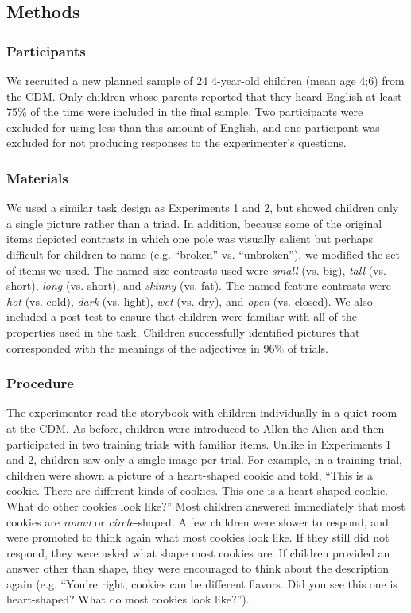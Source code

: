 \documentclass[man]{apa2}
\begin{document}
\subsection{Methods}

\subsubsection{Participants}

We recruited a new planned sample of 24 4-year-old children (mean age 4;6) from the CDM.  Only children whose parents reported that they heard English at least 75\% of the time were included in the final sample.  Two participants were excluded for using less than this amount of English, and one participant was excluded for not producing responses to the experimenter's questions.

\subsubsection{Materials}

We used a similar task design as Experiments 1 and 2, but showed children only a single picture rather than a triad.  In addition, because some of the original items depicted contrasts in which one pole was visually salient but perhaps difficult for children to name (e.g. ``broken'' vs. ``unbroken''), we modified the set of items we used.  The named size contrasts used were \emph{small} (vs. big), \emph{tall} (vs. short), \emph{long} (vs. short), and \emph{skinny} (vs. fat).  The named feature contrasts were \emph{hot} (vs. cold), \emph{dark} (vs. light), \emph{wet} (vs. dry), and \emph{open} (vs. closed).  We also included a post-test to ensure that children were familiar with all of the properties used in the task.  Children successfully identified pictures that corresponded with the meanings of the adjectives in 96\% of trials.

\subsubsection{Procedure}

The experimenter read the storybook with children individually in a quiet room at the CDM. As before, children were introduced to Allen the Alien and then participated in two training trials with familiar items. Unlike in  Experiments 1 and 2, children saw only a single image per trial. For example, in a training trial, children were shown a picture of a heart-shaped cookie and told, ``This is a cookie.  There are different kinds of cookies.  This one is a heart-shaped cookie.  What do other cookies look like?'' Most children answered immediately that most cookies are \emph{round} or \emph{circle}-shaped. A few children were slower to respond, and were promoted to think again what most cookies look like. If they still did not respond, they were asked what shape most cookies are.  If children provided an answer other than shape, they were encouraged to think about the description again (e.g. ``You're right, cookies can be different flavors. Did you see this one is heart-shaped?  What do most cookies look like?''). 
\end{document}
